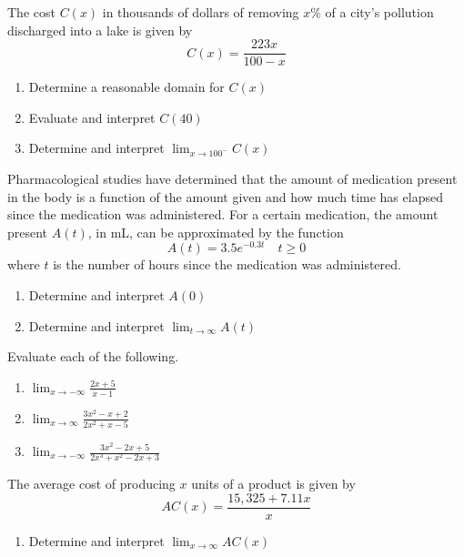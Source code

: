 \documentclass{article}
\newcounter{pset}
\begin{document}
The cost $C(x)$ in thousands of dollars of removing $x\%$ of a city's pollution discharged into a lake is given by
\[
C(x) = \frac{223x}{100-x}
\]
\begin{enumerate}   \setcounter{enumi}{\value{pset}}
    \item Determine a reasonable domain for $C(x)$
    \item Evaluate and interpret $C(40)$
    \item Determine and interpret $\lim_{x \to 100^-} C(x)$
\end{enumerate} \setcounter{pset}{\value{enumi}}
\bigskip 

Pharmacological studies have determined that the amount of medication present in the body is a function of the amount given and how much time has elapsed since the medication was administered. For a certain medication, the amount present $A(t)$, in mL, can be approximated by the function
\[
A(t) = 3.5e^{-0.3t} \quad t \geq 0
\]
where $t$ is the number of hours since the medication was administered.
\begin{enumerate}   \setcounter{enumi}{\value{pset}}
    \item Determine and interpret $A(0)$
    \item Determine and interpret $\lim_{t \to \infty} A(t)$
\end{enumerate} \setcounter{pset}{\value{enumi}}
\bigskip 

Evaluate each of the following.
\begin{multicols}{3}
\begin{enumerate}   \setcounter{enumi}{\value{pset}}
    \item $\lim_{x \to -\infty} \frac{2x+5}{x-1}$
    \item $\lim_{x \to \infty} \frac{3x^2-x+2}{2x^2+x-5}$
    \item $\lim_{x \to -\infty} \frac{3x^2-2x+5}{2x^3+x^2-2x+3}$
\end{enumerate} \setcounter{pset}{\value{enumi}}
\end{multicols}
\bigskip 

The average cost of producing $x$ units of a product is given by 
    \[
    AC(x) = \frac{15,325 + 7.11x}{x}
    \]
\begin{enumerate}   \setcounter{enumi}{\value{pset}}
    \item Determine and interpret $\lim_{x \to \infty} AC(x)$
\end{enumerate} \setcounter{pset}{\value{enumi}}

\newpage 
\end{document}
